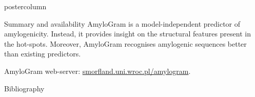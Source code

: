 \documentclass[final]{beamer}\usepackage[]{graphicx}\usepackage[]{color}
\begin{document}
\begin{frame}
\begin{columns}
\begin{column}{.51\textwidth}
\begin{beamercolorbox}[center,wd=\textwidth]{postercolumn}
\begin{minipage}[T]{.95\textwidth}
{\begin{block}{Summary and availability}
AmyloGram is a model-independent predictor of amylogenicity. Instead, it provides insight on the structural features present in the hot-spots. Moreover, AmyloGram recognises amylogenic sequences better than existing predictors.

\medskip

AmyloGram web-server: \url{smorfland.uni.wroc.pl/amylogram}.
\end{block}
\vfill


\begin{block}{Bibliography}
  \tiny{
  
  
  }
  \end{block}
  \vfill

}
\end{minipage}
\end{beamercolorbox}
\end{column}
\end{columns}  
\end{frame}
\end{document}
